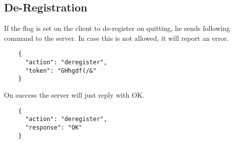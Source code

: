 \documentclass{article}
\begin{document}
	\subsection*{De-Registration}
	If the flag is set on the client to de-register on quitting, he sends following command to the server. In case this is not allowed, it will report an error.
	\begin{verbatim}
	{
	  "action": "deregister", 
	  "token": "GHhgdf(/&"
	}
	\end{verbatim}
	On success the server will just reply with OK.
	\begin{verbatim}
	{
	  "action": "deregister",
	  "response": "OK"
	}
	\end{verbatim}
\end{document}
